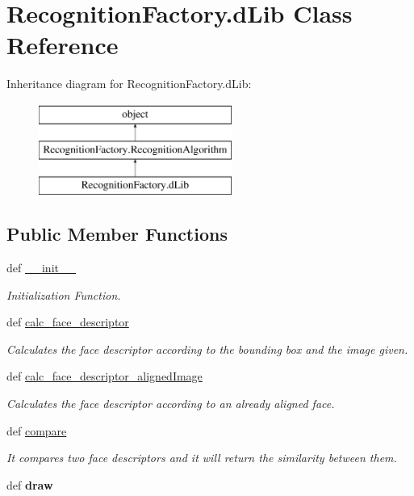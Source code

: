 \hypertarget{classRecognitionFactory_1_1dLib}{\section{Recognition\-Factory.\-d\-Lib Class Reference}
\label{classRecognitionFactory_1_1dLib}
}
Inheritance diagram for Recognition\-Factory.\-d\-Lib\-:\begin{figure}[H]
\begin{center}
\leavevmode
\includegraphics[height=3.000000cm]{classRecognitionFactory_1_1dLib}
\end{center}
\end{figure}
\subsection*{Public Member Functions}
\begin{DoxyCompactItemize}
\item 
def \hyperlink{classRecognitionFactory_1_1dLib_a7bb73498790a1728080d244b168708da}{\-\_\-\-\_\-init\-\_\-\-\_\-}
\begin{DoxyCompactList}\small\item\em Initialization Function. \end{DoxyCompactList}\item 
def \hyperlink{classRecognitionFactory_1_1dLib_acc97bda5d45cea6211c579800157cfff}{calc\-\_\-face\-\_\-descriptor}
\begin{DoxyCompactList}\small\item\em Calculates the face descriptor according to the bounding box and the image given. \end{DoxyCompactList}\item 
def \hyperlink{classRecognitionFactory_1_1dLib_a40973a6daa92cf8801b0e3651a29c83c}{calc\-\_\-face\-\_\-descriptor\-\_\-aligned\-Image}
\begin{DoxyCompactList}\small\item\em Calculates the face descriptor according to an already aligned face. \end{DoxyCompactList}\item 
def \hyperlink{classRecognitionFactory_1_1dLib_adf0aa845ca2d8ff90bb685722dc77f2d}{compare}
\begin{DoxyCompactList}\small\item\em It compares two face descriptors and it will return the similarity between them. \end{DoxyCompactList}\item 
\hypertarget{classRecognitionFactory_1_1dLib_ad428d6482b785537ae2e86113c6ba17d}{def {\bfseries draw}}\label{classRecognitionFactory_1_1dLib_ad428d6482b785537ae2e86113c6ba17d}

\end{DoxyCompactItemize}
